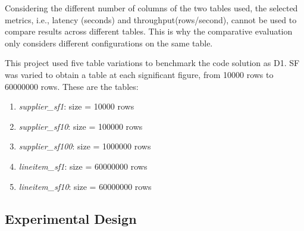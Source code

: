 Considering the different number of columns of the two tables used, the selected metrics, i.e., latency (seconds) and throughput(rows/second), cannot be used to compare results across different tables. This is why the comparative evaluation only considers different configurations on the same table.

This project used five table variations to benchmark the code solution as D1. \gls{SF} was varied to obtain a table at each significant figure, from 10000 rows to 60000000 rows. These are the tables:
\begin{enumerate}
    \item \textit{supplier\_sf1}: size = 10000 rows
    \item \textit{supplier\_sf10}: size = 100000 rows
    \item \textit{supplier\_sf100}: size = 1000000 rows
    \item \textit{lineitem\_sf1}: size = 60000000 rows
    \item \textit{lineitem\_sf10}: size = 60000000 rows
\end{enumerate}

\subsection{Experimental Design}
\label{subsec:experimental_design}
%


